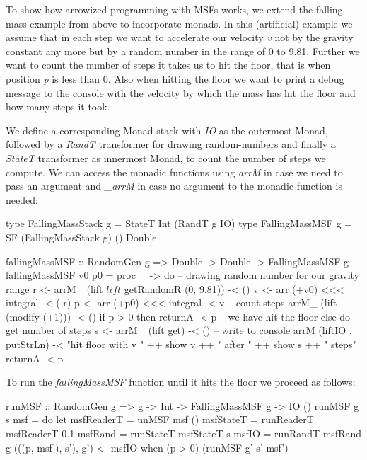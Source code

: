 To show how arrowized programming with MSFs works, we extend the falling mass example from above to incorporate monads. In this (artificial) example we assume that in each step we want to accelerate our velocity \textit{v} not by the gravity constant any more but by a random number in the range of 0 to 9.81. Further we want to count the number of steps it takes us to hit the floor, that is when position \textit{p} is less than 0. Also when hitting the floor we want to print a debug message to the console with the velocity by which the mass has hit the floor and how many steps it took.

We define a corresponding Monad stack with \textit{IO} as the outermost Monad, followed by a \textit{RandT} transformer for drawing random-numbers and finally a \textit{StateT} transformer as innermost Monad, to count the number of steps we compute. We can access the monadic functions using \textit{arrM} in case we need to pass an argument and \textit{\_arrM} in case no argument to the monadic function is needed:

\begin{HaskellCode}
type FallingMassStack g = StateT Int (RandT g IO)
type FallingMassMSF g   = SF (FallingMassStack g) () Double

fallingMassMSF :: RandomGen g => Double -> Double -> FallingMassMSF g
fallingMassMSF v0 p0 = proc _ -> do
  -- drawing random number for our gravity range
  r <- arrM_ (lift $ lift $ getRandomR (0, 9.81)) -< ()
  v <- arr (+v0) <<< integral -< (-r)
  p <- arr (+p0) <<< integral -< v
  -- count steps
  arrM_ (lift (modify (+1))) -< ()
  if p > 0
    then returnA -< p
    -- we have hit the floor
    else do
      -- get number of steps
      s <- arrM_ (lift get) -< ()
      -- write to console
      arrM (liftIO . putStrLn) -< "hit floor with v " ++ show v ++ 
                                  " after " ++ show s ++ " steps"
      returnA -< p
\end{HaskellCode}

To run the \textit{fallingMassMSF} function until it hits the floor we proceed as follows:

\begin{HaskellCode}
runMSF :: RandomGen g => g -> Int -> FallingMassMSF g -> IO ()
runMSF g s msf = do
  let msfReaderT = unMSF msf ()
      msfStateT  = runReaderT msfReaderT 0.1
      msfRand    = runStateT msfStateT s
      msfIO      = runRandT msfRand g
  (((p, msf'), s'), g') <- msfIO
  when (p > 0) (runMSF g' s' msf')
\end{HaskellCode}

